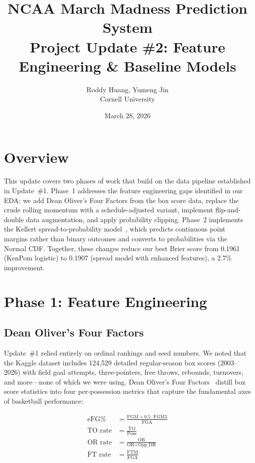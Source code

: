 \documentclass[11pt,a4paper]{article}
\title{%
    \vspace{-1cm}
    {\LARGE\bfseries NCAA March Madness Prediction System}\\[6pt]
    {\large Project Update \#2: Feature Engineering \& Baseline Models}
}
\author{
    Roddy Huang, Yumeng Jin \\
    Cornell University
}
\date{March 28, 2026}
\begin{document}
\maketitle
\thispagestyle{fancy}

\section{Overview}

This update covers two phases of work that build on the data pipeline established in Update~\#1. Phase~1 addresses the feature engineering gaps identified in our EDA: we add Dean Oliver's Four Factors from the box score data, replace the crude rolling momentum with a schedule-adjusted variant, implement flip-and-double data augmentation, and apply probability clipping. Phase~2 implements the Kellert spread-to-probability model~\citep{kellert2017}, which predicts continuous point margins rather than binary outcomes and converts to probabilities via the Normal CDF. Together, these changes reduce our best Brier score from 0.1961 (KenPom logistic) to 0.1907 (spread model with enhanced features), a 2.7\% improvement.


\section{Phase 1: Feature Engineering}

\subsection{Dean Oliver's Four Factors}

Update~\#1 relied entirely on ordinal rankings and seed numbers. We noted that the Kaggle dataset includes 124,529 detailed regular-season box scores (2003--2026) with field goal attempts, three-pointers, free throws, rebounds, turnovers, and more---none of which we were using. Dean Oliver's Four Factors~\citep{oliver2004} distill box score statistics into four per-possession metrics that capture the fundamental axes of basketball performance:

\begin{align}
    \text{eFG\%} &= \frac{\text{FGM} + 0.5 \cdot \text{FGM3}}{\text{FGA}} \label{eq:efg} \\[4pt]
    \text{TO rate} &= \frac{\text{TO}}{\text{Poss}} \label{eq:to} \\[4pt]
    \text{OR rate} &= \frac{\text{OR}}{\text{OR} + \text{Opp\_DR}} \label{eq:or} \\[4pt]
    \text{FT rate} &= \frac{\text{FTM}}{\text{FGA}} \label{eq:ft}
\end{align}
\end{document}
